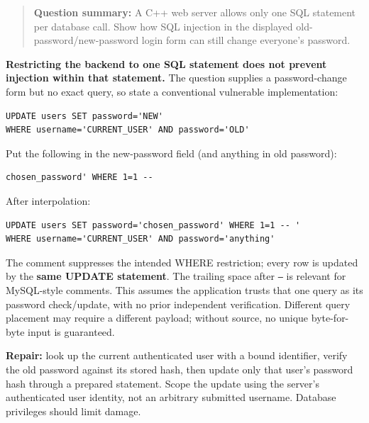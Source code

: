 \documentclass[11pt,a4paper]{article}
\begin{document}
\begin{quote}\small

\textbf{Question summary:} A C++ web server allows only one SQL statement per database call. Show how SQL injection in the displayed old-password/\allowbreak{}new-password login form can still change everyone’s password.



\end{quote}

\textbf{Restricting the backend to one SQL statement does not prevent injection within that statement.} The question supplies a password-change form but no exact query,\allowbreak{} so state a conventional vulnerable implementation:



\begin{Verbatim}[breaklines=true,breakanywhere=true,fontsize=\small,frame=single,rulecolor=\color{PanelBorder}]
UPDATE users SET password='NEW'
WHERE username='CURRENT_USER' AND password='OLD'
\end{Verbatim}

Put the following in the new-password field (and anything in old password):



\begin{Verbatim}[breaklines=true,breakanywhere=true,fontsize=\small,frame=single,rulecolor=\color{PanelBorder}]
chosen_password' WHERE 1=1 -- 
\end{Verbatim}

After interpolation:



\begin{Verbatim}[breaklines=true,breakanywhere=true,fontsize=\small,frame=single,rulecolor=\color{PanelBorder}]
UPDATE users SET password='chosen_password' WHERE 1=1 -- '
WHERE username='CURRENT_USER' AND password='anything'
\end{Verbatim}

The comment suppresses the intended WHERE restriction; every row is updated by the \textbf{same UPDATE statement}. The trailing space after \texttt{--} is relevant for MySQL-style comments. This assumes the application trusts that one query as its password check/\allowbreak{}update,\allowbreak{} with no prior independent verification. Different query placement may require a different payload; without source,\allowbreak{} no unique byte-for-byte input is guaranteed.


\textbf{Repair:} look up the current authenticated user with a bound identifier,\allowbreak{} verify the old password against its stored hash,\allowbreak{} then update only that user’s password hash through a prepared statement. Scope the update using the server’s authenticated user identity,\allowbreak{} not an arbitrary submitted username. Database privileges should limit damage.
\end{document}
